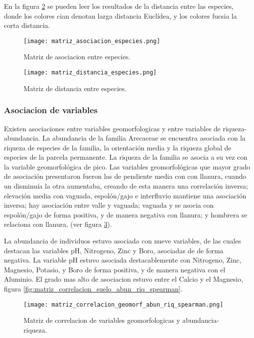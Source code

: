 \documentclass[11pt,]{article}
\begin{document}
En la figura \ref{fig:matriz_distancia_especies} se pueden leer los
resultados de la distancia entre las especies, donde los colores cian
denotan larga distancia Euclídea, y los colores fucsia la corta
distancia.

\begin{figure}
\centering
\texttt{[image: matriz\_asociacion\_especies.png]}
\caption{Matriz de asociacion entre especies.
\label{fig:matriz_asociacion_especies}}
\end{figure}

\begin{figure}
\centering
\texttt{[image: matriz\_distancia\_especies.png]}
\caption{Matriz de distancia entre especies.
\label{fig:matriz_distancia_especies}}
\end{figure}

\subsubsection{Asociacion de variables}\label{asociacion-de-variables}

Existen asociaciones entre variables geomorfologicas y entre variables
de riqueza-abundancia. La abundancia de la familia Arecaceae se
encuentra asociada con la riqueza de especies de la familia, la
orientación media y la riqueza global de especies de la parcela
permanente. La riqueza de la familia se asocia a su vez con la variable
geomorfológica de pico. Las variables geomorfológicas que mayor grado de
asociación presentaron fueron las de pendiente media con con llanura,
cuando un disminuía la otra aumentaba, creando de esta manera una
correlación inversa; elevación media con vaguada, espolón/gajo e
interfluvio mantiene una asociación inversa; hay asociación entre valle
y vaguada; vaguada y se asocia con espolón/gajo de forma positiva, y de
manera negativa con llanura; y hombrera se relaciona con llanura, (ver
figura \ref{fig:matriz_correlacion_geomorf_abun_riq_spearman}).

La abundancia de individuos estuvo asociada con nueve variables, de las
cuales destacan las variables pH, Nitrogeno, Zinc y Boro, asociadas de
de forma negativa. La variable pH estuvo asociada destacablemente con
Nitrogeno, Zinc, Magnesio, Potasio, y Boro de forma positiva, y de
manera negativa con el Aluminio. El grado mas alto de asociacion estuvo
entre el Calcio y el Magnesio, figura
\ref{fig:matriz_correlacion_suelo_abun_riq_spearman}.

\begin{figure}
\centering
\texttt{[image: matriz\_correlacion\_geomorf\_abun\_riq\_spearman.png]}
\caption{Matriz de correlacion de variables geomorfologicas y
abundancia-riqueza.
\label{fig:matriz_correlacion_geomorf_abun_riq_spearman}}
\end{figure}
\end{document}
